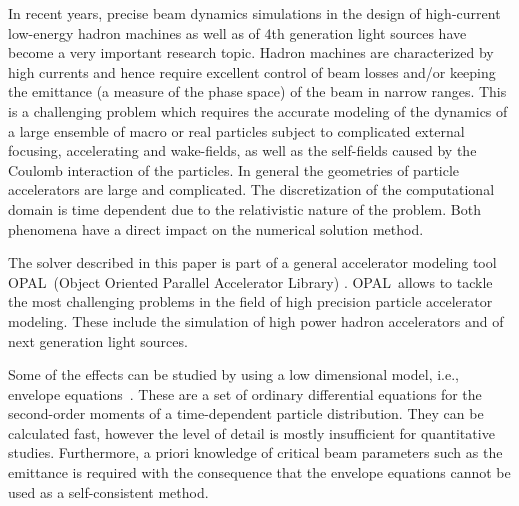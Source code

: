 \documentclass[a4paper,10pt,3p,final,pdftex]{elsarticle}
\newcommand{\opal}{\textsc{OPAL}}
\begin{document}
In recent years, precise beam dynamics simulations in the design of
high-current low-energy hadron machines as well as of 4th generation
light sources have become a very important research topic.  Hadron
machines are characterized by high currents and hence require excellent
control of beam losses and/or keeping the emittance (a measure of the
phase space) of the beam in narrow ranges. This is a challenging problem
which requires the accurate modeling of the dynamics of a large ensemble
of macro or real particles subject to complicated external focusing,
accelerating and wake-fields, as well as the self-fields caused by the
Coulomb interaction of the particles.  In general the geometries of
particle accelerators are large and complicated. The discretization of
the computational domain is time dependent due to the relativistic
nature of the problem.
Both phenomena have a direct impact on the numerical solution method.
 
The solver described in this paper is part of a general accelerator
modeling tool \opal~(Object Oriented Parallel Accelerator Library)
\cite{opal}.  \opal\ allows to tackle the most challenging problems in
the field of high precision particle accelerator modeling.  These
include the simulation of high power hadron accelerators and of next
generation light sources.

Some of the effects can be studied by using a low dimensional model,
i.e., envelope equations~\cite{sach:68, sach:71, stru-reis:1984,
  gluckstern1}.  These are a set of ordinary differential equations for
the second-order moments of a time-dependent particle distribution.
They can be calculated fast, however the level of detail is mostly 
insufficient for quantitative studies.  Furthermore, a priori knowledge of
critical beam parameters such as the emittance is required with the consequence that the
envelope equations cannot be used as a self-consistent method.
\end{document}
